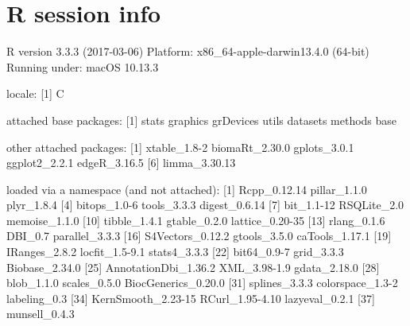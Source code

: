\documentclass[12pt]{article}
\begin{document}
\section{R session info}
\label{sessionInfo}
\begin{Schunk}
\begin{Soutput}
R version 3.3.3 (2017-03-06)
Platform: x86_64-apple-darwin13.4.0 (64-bit)
Running under: macOS  10.13.3

locale:
[1] C

attached base packages:
[1] stats     graphics  grDevices utils     datasets  methods   base     

other attached packages:
[1] xtable_1.8-2   biomaRt_2.30.0 gplots_3.0.1   ggplot2_2.2.1  edgeR_3.16.5  
[6] limma_3.30.13 

loaded via a namespace (and not attached):
 [1] Rcpp_0.12.14         pillar_1.1.0         plyr_1.8.4          
 [4] bitops_1.0-6         tools_3.3.3          digest_0.6.14       
 [7] bit_1.1-12           RSQLite_2.0          memoise_1.1.0       
[10] tibble_1.4.1         gtable_0.2.0         lattice_0.20-35     
[13] rlang_0.1.6          DBI_0.7              parallel_3.3.3      
[16] S4Vectors_0.12.2     gtools_3.5.0         caTools_1.17.1      
[19] IRanges_2.8.2        locfit_1.5-9.1       stats4_3.3.3        
[22] bit64_0.9-7          grid_3.3.3           Biobase_2.34.0      
[25] AnnotationDbi_1.36.2 XML_3.98-1.9         gdata_2.18.0        
[28] blob_1.1.0           scales_0.5.0         BiocGenerics_0.20.0 
[31] splines_3.3.3        colorspace_1.3-2     labeling_0.3        
[34] KernSmooth_2.23-15   RCurl_1.95-4.10      lazyeval_0.2.1      
[37] munsell_0.4.3       
\end{Soutput}
\end{Schunk}
\end{document}
